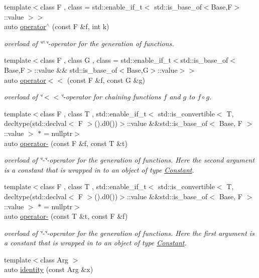 \begin{DoxyCompactItemize}
{\footnotesize template$<$class F , class  = std\-::enable\-\_\-if\-\_\-t$<$ std\-::is\-\_\-base\-\_\-of$<$\-Base,\-F$>$\-::value $>$$>$ }\\auto \hyperlink{namespaceFunG_aeb22ff63cd78cb63d81b601c656da2c1}{operator$^\wedge$} (const F \&f, int k)
\begin{DoxyCompactList}\small\item\em overload of \char`\"{}$^\wedge$\char`\"{}-\/operator for the generation of functions. \end{DoxyCompactList}\item 
{\footnotesize template$<$class F , class G , class  = std\-::enable\-\_\-if\-\_\-t$<$std\-::is\-\_\-base\-\_\-of$<$\-Base,\-F$>$\-::value \&\&                                     std\-::is\-\_\-base\-\_\-of$<$\-Base,\-G$>$\-::value$>$$>$ }\\auto \hyperlink{namespaceFunG_a56701b5e83b96d2d6cc5c482e36caa39}{operator$<$$<$} (const F \&f, const G \&g)
\begin{DoxyCompactList}\small\item\em overload of \char`\"{}$<$$<$\char`\"{}-\/operator for chaining functions $f$ and $g$ to $ f \circ g $. \end{DoxyCompactList}\item 
{\footnotesize template$<$class F , class T , std\-::enable\-\_\-if\-\_\-t$<$ std\-::is\-\_\-convertible$<$ T, decltype(std\-::declval$<$ F $>$().\-d0())$>$\-::value \&\&std\-::is\-\_\-base\-\_\-of$<$ Base, F $>$\-::value $>$ $\ast$  = nullptr$>$ }\\auto \hyperlink{namespaceFunG_aa0c4552dee9179fb50b57ece863d835a}{operator-\/} (const F \&f, const T \&t)
\begin{DoxyCompactList}\small\item\em overload of \char`\"{}-\/\char`\"{}-\/operator for the generation of functions. Here the second argument is a constant that is wrapped in to an object of type \hyperlink{structFunG_1_1Constant}{Constant}. \end{DoxyCompactList}\item 
{\footnotesize template$<$class F , class T , std\-::enable\-\_\-if\-\_\-t$<$ std\-::is\-\_\-convertible$<$ T, decltype(std\-::declval$<$ F $>$().\-d0())$>$\-::value \&\&std\-::is\-\_\-base\-\_\-of$<$ Base, F $>$\-::value $>$ $\ast$  = nullptr$>$ }\\auto \hyperlink{namespaceFunG_a7f522d98a8d5bc8c3b11599d3136ded4}{operator-\/} (const T \&t, const F \&f)
\begin{DoxyCompactList}\small\item\em overload of \char`\"{}-\/\char`\"{}-\/operator for the generation of functions. Here the first argument is a constant that is wrapped in to an object of type \hyperlink{structFunG_1_1Constant}{Constant}. \end{DoxyCompactList}\item 
\hypertarget{namespaceFunG_a165e879e76d3a2a8906938f3658445ce}{{\footnotesize template$<$class Arg $>$ }\\auto \hyperlink{namespaceFunG_a165e879e76d3a2a8906938f3658445ce}{identity} (const Arg \&x)}\label{namespaceFunG_a165e879e76d3a2a8906938f3658445ce}


\end{DoxyCompactItemize}
